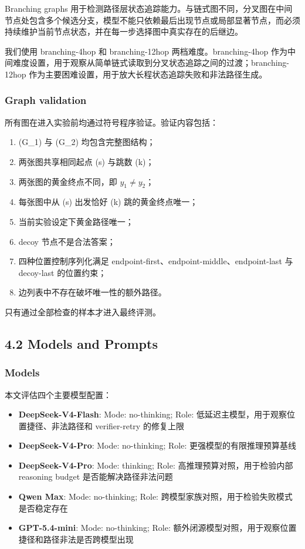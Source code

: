 \documentclass[
  11pt,
]{article}
\providecommand{\tightlist}{%
  \setlength{\itemsep}{0pt}\setlength{\parskip}{0pt}}
\begin{document}
Branching graphs
用于检测路径层状态追踪能力。与链式图不同，分叉图在中间节点处包含多个候选分支，模型不能只依赖最后出现节点或局部显著节点，而必须持续维护当前节点状态，并在每一步选择图中真实存在的后继边。

我们使用 branching-4hop 和 branching-12hop 两档难度。branching-4hop
作为中间难度设置，用于观察从简单链式读取到分叉状态追踪之间的过渡；branching-12hop
作为主要困难设置，用于放大长程状态追踪失败和非法路径生成。

\subsubsection{Graph validation}\label{graph-validation}

所有图在进入实验前均通过符号程序验证。验证内容包括：

\begin{enumerate}
\def\labelenumi{\arabic{enumi}.}
\item
  (G\_1) 与 (G\_2) 均包含完整图结构；
\item
  两张图共享相同起点 (s) 与跳数 (k)；
\item
  两张图的黄金终点不同，即 \(y_1\neq y_2\)；
\item
  每张图中从 (s) 出发恰好 (k) 跳的黄金终点唯一；
\item
  当前实验设定下黄金路径唯一；
\item
  decoy 节点不是合法答案；
\item
  四种位置控制序列化满足 endpoint-first、endpoint-middle、endpoint-last
  与 decoy-last 的位置约束；
\item
  边列表中不存在破坏唯一性的额外路径。
\end{enumerate}

只有通过全部检查的样本才进入最终评测。

\subsection{4.2 Models and Prompts}\label{models-and-prompts}

\subsubsection{Models}\label{models}

本文评估四个主要模型配置：

\begin{itemize}
\tightlist
\item
  \textbf{DeepSeek-V4-Flash}: Mode: no-thinking; Role:
  低延迟主模型，用于观察位置捷径、非法路径和 verifier-retry 的修复上限
\item
  \textbf{DeepSeek-V4-Pro}: Mode: no-thinking; Role:
  更强模型的有限推理预算基线
\item
  \textbf{DeepSeek-V4-Pro}: Mode: thinking; Role:
  高推理预算对照，用于检验内部 reasoning budget 是否能解决路径非法问题
\item
  \textbf{Qwen Max}: Mode: no-thinking; Role:
  跨模型家族对照，用于检验失败模式是否稳定存在
\item
  \textbf{GPT-5.4-mini}: Mode: no-thinking; Role:
  额外闭源模型对照，用于观察位置捷径和路径非法是否跨模型出现
\end{itemize}
\end{document}
